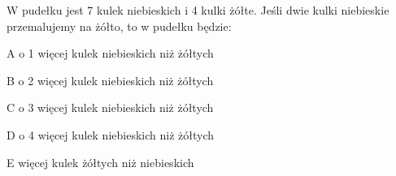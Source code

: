 \begin{tresc}
W pudełku jest 7 kulek niebieskich i 4 kulki żółte. Jeśli dwie kulki niebieskie przemalujemy na żółto, to w pudełku będzie:
\end{tresc}
\begin{wariant}{A} o 1 więcej kulek niebieskich niż żółtych \end{wariant}
\begin{wariant}{B} o 2 więcej kulek niebieskich niż żółtych \end{wariant}
\begin{wariant}{C} o 3 więcej kulek niebieskich niż żółtych \end{wariant}
\begin{wariant}{D} o 4 więcej kulek niebieskich niż żółtych \end{wariant}
\begin{wariant}{E} więcej kulek żółtych niż niebieskich \end{wariant}
